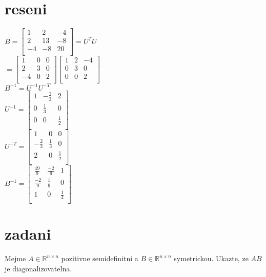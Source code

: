 \documentclass[a4paper]{article}
\begin{document}
\section*{reseni}
$ B =
\begin{bmatrix}
	1 & 2 & -4\\
	2 & 13 & -8\\
	-4 & -8 & 20\\
\end{bmatrix}
= U^TU
$\\
$=
\begin{bmatrix}
	1 & 0 & 0\\
	2 & 3 & 0\\
	-4 & 0 & 2\\
\end{bmatrix}
\begin{bmatrix}
	1 & 2 & -4\\
	0 & 3 & 0\\
	0 & 0 & 2\\
\end{bmatrix}
$\\
$B^{-1} = U^{-1}U^{-T}$\\
$
U^{-1}=
\begin{bmatrix}
	1 & -\frac{2}{3} & 2\\
	0 & \frac{1}{3} & 0\\
	0 & 0 & \frac{1}{2}\\
\end{bmatrix}
$\\
$
U^{-T}=
\begin{bmatrix}
	1 & 0 & 0\\
	-\frac{2}{3} & \frac{1}{3} & 0\\
	2 & 0 & \frac{1}{2}\\
\end{bmatrix}
$\\
$B^{-1} = 
\begin{bmatrix}
	\frac{49}{9} & \frac{-2}{9} & 1\\
	\frac{-2}{9} & \frac{1}{9} & 0\\
	1 & 0 & \frac{1}{4}\\
\end{bmatrix}
$\\










\section*{zadani}
Mejme $A \in \mathbb{R}^{n\times n}$ pozitivne semidefinitni
a $B\in\mathbb{R}^{n\times n}$ symetrickou.
Ukazte, ze $AB$ je diagonalizovatelna. 
\end{document}
